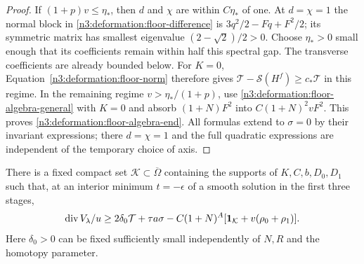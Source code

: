 \begin{proof}
If $(1+p)v\le\eta_*$, then $d$ and $\chi$ are within $C\eta_*$
of one. At $d=\chi=1$ the normal block in
\eqref{n3:deformation:floor-difference} is
$3q^2/2-Fq+F^2/2$; its symmetric matrix has smallest eigenvalue
$(2-\sqrt2)/2>0$.
Choose $\eta_*>0$ small enough that its coefficients remain within
half this spectral gap. The transverse coefficients are already
bounded below. For $K=0$, Equation~\eqref{n3:deformation:floor-norm}
therefore gives $\mathcal T-\mathcal S(H^f)\ge c_*\mathcal T$
in this regime.
In the remaining regime $v>\eta_* /(1+p)$, use
\eqref{n3:deformation:floor-algebra-general} with $K=0$ and absorb
$(1+N)F^2$ into $C(1+N)^2vF^2$.
This proves \eqref{n3:deformation:floor-algebra-end}.
All formulas extend to $\sigma=0$ by their invariant expressions;
there $d=\chi=1$ and the full quadratic expressions are independent of
the temporary choice of axis.
\end{proof}

\begin{lemma}
\label{n3:deformation:floor-errors}
There is a fixed compact set $\mathcal K\subset\overline\Omega$ containing
the supports of $K,C,b,D_0,D_1$ such that, at an interior minimum
$t=-\epsilon$ of a smooth solution in the first three stages,
\begin{equation}\label{n3:deformation:floor-divergence-lower}
 \operatorname{div} V_\lambda/u
 \ge 2\delta_0\mathcal T+\tau a\sigma
      -C(1+N)^A
       [\mathbf1_{\mathcal K}+v(\rho_0+\rho_1)].
\end{equation}
Here $\delta_0>0$ can be fixed sufficiently small independently of
$N,R$ and the homotopy parameter.
\end{lemma}

